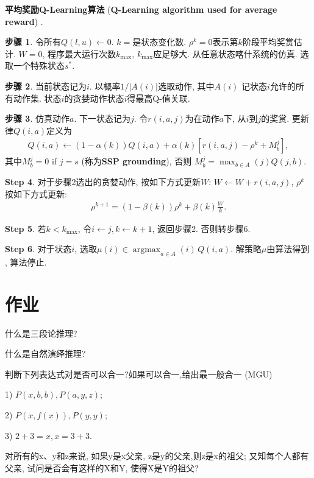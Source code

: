 \textbf{平均奖励Q-Learning算法} (\textbf{Q-Learning algorithm used for average reward}) \cite{gosavi2004reinforcement}.

\textbf{步骤 1}. 令所有$Q(l,u) \leftarrow 0$. $k=$是状态变化数. $\rho^k=0$表示第$k$阶段平均奖赏估计. $W=0$, 程序最大运行次数$k_{\max}$, $k_{\max}$应足够大. 从任意状态喀什系统的仿真. 选取一个特殊状态$s^{*}$.

\textbf{步骤 2}. 当前状态记为$i$. 以概率$1/|A (i)|$选取动作, 其中$A(i)$ 记状态$i$允许的所有动作集. 状态$i$的贪婪动作状态$i$得最高Q-值关联.

\textbf{步骤 3}. 仿真动作$a$. 下一状态记为$j$. 令$r(i, a, j)$为在动作$a$下, 从$i$到$j$的奖赏. 更新律$Q(i,a)$定义为
\begin{eqnarray}
  Q(i,a)\leftarrow (1-\alpha(k))Q(i,a)+\alpha(k)[r(i,a,j)-\rho^k+M_b^j],
\end{eqnarray}
其中$M_b^j= 0$ if $j = s$ (称为\textbf{SSP grounding}), 否则 $M^j_b= \max_{b\in A}(j)Q(j,b)$.

\textbf{Step 4}. 对于步骤2选出的贪婪动作, 按如下方式更新$W$: $W \leftarrow W + r(i, a, j)$, $\rho^k$按如下方式更新:
\begin{eqnarray}
  \rho^{k+1}= (1 - \beta(k))\rho^k+ \beta(k)\frac{W}{k}.
\end{eqnarray}

\textbf{Step 5}. 若$k < k_{\max}$, 令$i \leftarrow j, k \leftarrow k + 1$, 返回步骤2. 否则转步骤6.

\textbf{Step 6}. 对于状态$i$, 选取$\mu(i)\in  \mathop{\arg\max}_{a\in A }(i)\, Q(i, a)$. 解策略$\mu$由算法得到 , 算法停止.

\section{作业}

\begin{think}
    什么是三段论推理?
\end{think}

\begin{think}
    什么是自然演绎推理?
\end{think}

\begin{think}
判断下列表达式对是否可以合一?如果可以合一,给出最一般合一 (MGU)

1) $P(x,b,b), P(a, y, z)$;

2) $P(x,f(x)),P(y,y)$;

3) $2+3=x,x=3+3$.
\end{think}

\begin{think}
    对所有的x、y和z来说, 如果y是x父亲, z是y的父亲,则z是x的祖父; 又知每个人都有父亲, 试问是否会有这样的X和Y, 使得X是Y的祖父?
\end{think}
